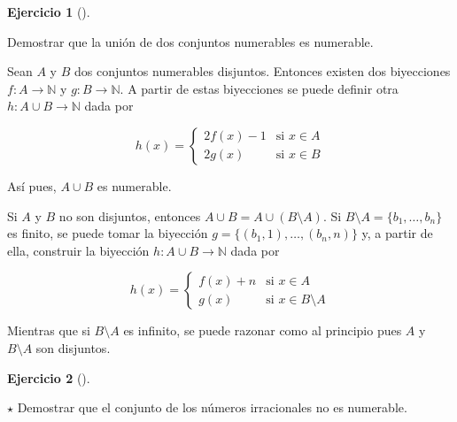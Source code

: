 \documentclass[
  spanish,
  a4paper,
]{scrreport}
\theoremstyle{definition}
\newtheorem{exercise}{Ejercicio}[chapter]
\theoremstyle{remark}
\begin{document}
\begin{exercise}[]\protect\hypertarget{exr-union-numerables}{}\label{exr-union-numerables}

Demostrar que la unión de dos conjuntos numerables es numerable.

\end{exercise}

\begin{tcolorbox}[enhanced jigsaw, arc=.35mm, bottomrule=.15mm, bottomtitle=1mm, breakable, colback=white, colbacktitle=quarto-callout-tip-color!10!white, colframe=quarto-callout-tip-color-frame, coltitle=black, left=2mm, leftrule=.75mm, opacityback=0, opacitybacktitle=0.6, rightrule=.15mm, title=\textcolor{quarto-callout-tip-color}{\faLightbulb}\hspace{0.5em}{Solución}, titlerule=0mm, toprule=.15mm, toptitle=1mm]

Sean \(A\) y \(B\) dos conjuntos numerables disjuntos. Entonces existen
dos biyecciones \(f:A\to \mathbb{N}\) y \(g:B\to \mathbb{N}\). A partir
de estas biyecciones se puede definir otra \(h:A\cup B\to \mathbb{N}\)
dada por

\[h(x)=
\begin{cases}
2f(x)-1 & \mbox{si } x\in A\\
2g(x) & \mbox{si } x\in B
\end{cases}
\]

Así pues, \(A\cup B\) es numerable.

Si \(A\) y \(B\) no son disjuntos, entonces
\(A\cup B=A\cup (B\setminus A)\). Si
\(B\setminus A=\{b_1,\ldots, b_n\}\) es finito, se puede tomar la
biyección \(g=\{(b_1,1),\ldots,(b_n,n)\}\) y, a partir de ella,
construir la biyección \(h:A\cup B\to \mathbb{N}\) dada por

\[h(x)=
\begin{cases}
f(x)+n & \mbox{si } x\in A\\
g(x) & \mbox{si } x\in B\setminus A
\end{cases}
\]

Mientras que si \(B\setminus A\) es infinito, se puede razonar como al
principio pues \(A\) y \(B\setminus A\) son disjuntos.

\end{tcolorbox}

\begin{exercise}[]\protect\hypertarget{exr-irracionales-no-numerables}{}\label{exr-irracionales-no-numerables}

\(\star\) Demostrar que el conjunto de los números irracionales no es
numerable.

\end{exercise}
\end{document}

